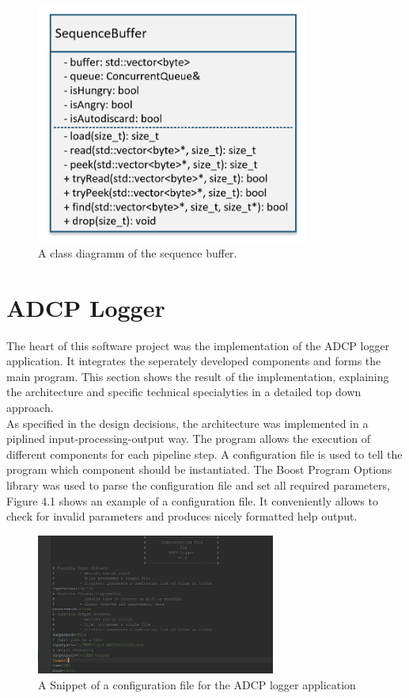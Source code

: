 \begin{figure}[h]
\centering
      \includegraphics[width=0.8\textwidth]{seqbuf}
        \caption{A class diagramm of the sequence buffer.}
\end{figure}

\section{ADCP Logger}
The heart of this software project was the implementation of the ADCP logger application. It integrates the seperately developed components and forms the main program. This section shows the result of the implementation, explaining the architecture and specific technical specialyties in a detailed top down approach.\\
As specified in the design decisions, the architecture was implemented in a piplined input-processing-output way. The program allows the execution of different components for each pipeline step. A configuration file is used to tell the program which component should be instantiated. The Boost Program Options library was used to parse the configuration file and set all required parameters, Figure 4.1 shows an example of a configuration file. It conveniently allows to check for invalid parameters and produces nicely formatted help output.

\begin{figure}[h]
\centering
      \includegraphics[width=0.7\textwidth]{config}
        \caption{A Snippet of a configuration file for the ADCP logger application}
\end{figure}

